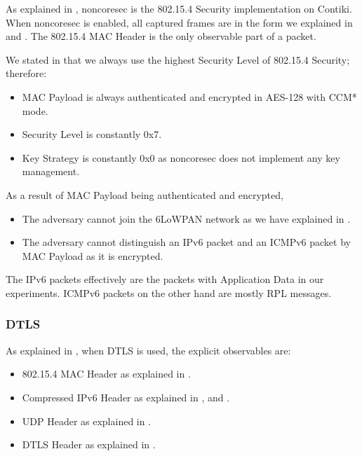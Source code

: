 As explained in , noncoresec is the 802.15.4 Security implementation on Contiki. When noncoresec is enabled, all captured frames are in the form we explained in  and . The 802.15.4 MAC Header is the only observable part of a packet.

We stated in  that we always use the highest Security Level of 802.15.4 Security; therefore:
\begin{itemize}
	\item MAC Payload is always authenticated and encrypted in AES-128 with CCM* mode.
	\item Security Level is constantly 0x7.
	\item Key Strategy is constantly 0x0 as noncoresec does not implement any key management.
\end{itemize}

As a result of MAC Payload being authenticated and encrypted, 
\begin{itemize}
	\item The adversary cannot join the 6LoWPAN network as we have explained in .
	\item The adversary cannot distinguish an IPv6 packet and an ICMPv6 packet by MAC Payload as it is encrypted. 
\end{itemize}

The IPv6 packets effectively are the packets with Application Data in our experiments. ICMPv6 packets on the other hand are mostly RPL messages.

\subsubsection{DTLS} \label{Subsubsec: Explicit DTLS}

As explained in , when DTLS is used, the explicit observables are: 

\begin{itemize}
	\item 802.15.4 MAC Header as explained in .
	
	\item Compressed IPv6 Header as explained in ,  and .
	
	\item UDP Header as explained in .
	
	\item DTLS Header as explained in .
\end{itemize}


